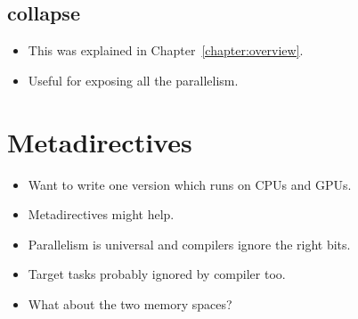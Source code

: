 \subsection{collapse}
\begin{itemize}
  \item This was explained in Chapter~\ref{chapter:overview}.
  \item Useful for exposing all the parallelism.
\end{itemize}




\section{Metadirectives}
\begin{itemize}
  \item Want to write one version which runs on CPUs and GPUs.
  \item Metadirectives might help.
  \item Parallelism is universal and compilers ignore the right bits.
  \item Target tasks probably ignored by compiler too.
  \item What about the two memory spaces?
\end{itemize}

